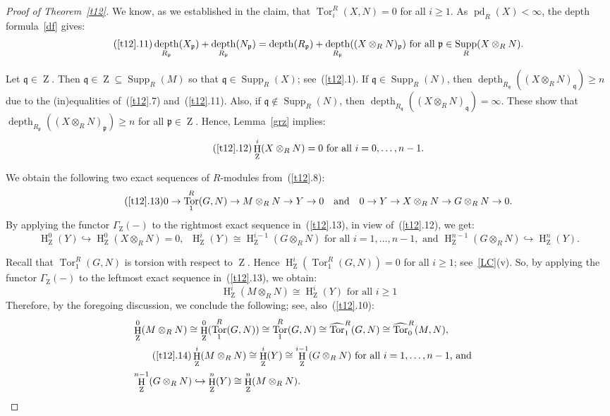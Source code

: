 \documentclass[11pt]{amsart}
\theoremstyle{definition}
\theoremstyle{definition}
\numberwithin{equation}{section}
\newcommand{\fp}{\mathfrak{p}}
\newcommand{\fq}{\mathfrak{q}}
\DeclareMathOperator{\mz}{Z}
\DeclareMathOperator{\depth}{depth}
\DeclareMathOperator{\hh}{H}
\DeclareMathOperator{\pd}{pd}
\DeclareMathOperator{\Supp}{Supp}
\DeclareMathOperator{\Tor}{Tor}
\begin{document}
\begin{proof}[Proof of Theorem~\ref{t12}]
We know, as we established in the claim, that $\Tor_i^R(X,N)=0$ for all $i\geq 1$. As $\pd_R(X)<\infty$, the depth formula~\ref{df} gives:
\begin{equation}\tag{\ref{t12}.11}
\depth_{R_\fp}(X_\fp)+\depth_{R_\fp}(N_\fp)=\depth(R_{\fp})+\depth_{R_\fp}((X\otimes_RN)_\fp) \text{ for all } \fp\in\Supp_R(X\otimes_RN).
\end{equation}	

Let $\fq \in \mz$. Then $\fq \in \mz \subseteq  \Supp_R(M)$ so that $\fq \in \Supp_R(X)$; see~(\ref{t12}.1). If $\fq \in \Supp_R(N)$, then
$\depth_{R_\fq}((X\otimes_RN)_\fq)\geq n$ due to the (in)equalities of~(\ref{t12}.7) and~(\ref{t12}.11). Also, if $\fq \notin \Supp_R(N)$, then $\depth_{R_\fq}((X\otimes_RN)_\fq)=\infty$. These show that $\depth_{R_\fp}\left((X\otimes_RN)_\fp\right)\geq n$ for all $\fp \in \mz$. Hence, Lemma~\ref{grz} implies:
\begin{equation}\tag{\ref{t12}.12}
\hh^i_{\mz}(X\otimes_RN)=0 \text{  for  all  } i=0, \ldots, n-1.
\end{equation}

We obtain the following two exact sequences of $R$-modules from~(\ref{t12}.8):
\begin{equation}\tag{\ref{t12}.13}
0\rightarrow\Tor_1^R(G,N)\rightarrow M\otimes_RN\to Y\to0\ \ \text{ and }\ \ 0\to Y\rightarrow X\otimes_RN\rightarrow G\otimes_RN\rightarrow0.
\end{equation}
By applying the functor $\Gamma_{\mz}(-)$ to the rightmost exact sequence in~(\ref{t12}.13), in view of~(\ref{t12}.12), we get: $$\hh^{0}_{\mz}(Y)\hookrightarrow \hh^{0}_{\mz}(X\otimes_RN)=0,\;\; \hh^i_{\mz}(Y)\cong\hh^{i-1}_{\mz}(G\otimes_RN) \text{  for  all  } i=1, \ldots, n-1, \text{ and } \hh^{n-1}_{\mz}(G\otimes_RN)\hookrightarrow \hh^n_{\mz}(Y).$$

Recall that $\Tor_1^R(G,N)$ is torsion with respect to $\mz$. Hence $\hh^i_{\mz}(\Tor_1^R(G,N))=0$ for all $i\geq 1$; see~\ref{LC}(v). So, by applying the functor $\Gamma_{\mz}(-)$ to the leftmost exact sequence in~(\ref{t12}.13), we obtain:
$$ \hh^i_{\mz}(M\otimes_RN)\cong\hh^i_{\mz}(Y) \text{ for all }i\geq 1$$
Therefore, by the foregoing discussion, we conclude the following; see, also~(\ref{t12}.10):
\begin{align}
\notag{} & \hh^0_{\mz}(M\otimes_RN)\cong\hh^0_{\mz}(\Tor_1^R(G,N))\cong\Tor_1^R(G,N)\cong\widehat{\Tor}_1^R(G,N)\cong\widehat{\Tor}_0^R(M,N), \\ & 
\tag{\ref{t12}.14} \hh^i_{\mz}(M\otimes_RN)\cong\hh^i_{\mz}(Y)\cong\hh^{i-1}_{\mz}(G\otimes_RN) \text{  for  all  } i=1, \ldots, n-1 \text{, and } &\\
\notag{}&\hh^{n-1}_{\mz}(G\otimes_RN)\hookrightarrow\hh^n_{\mz}(Y)\cong\hh^n_{\mz}(M\otimes_RN).
\end{align}


\end{proof}
\end{document}
